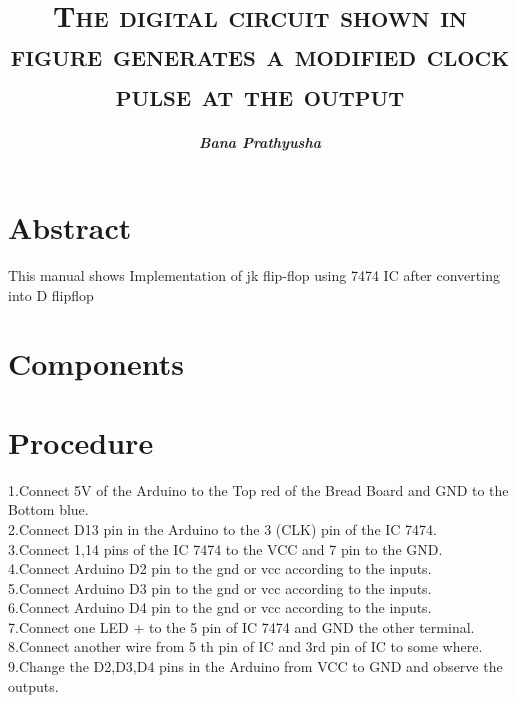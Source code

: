 \documentclass[jornal,10pt,twocolumn]{article}
\title{\textbf{\textsc{The digital circuit shown in figure generates a modified clock pulse at the output}}}
\author{\textit{\textbf{Bana Prathyusha}}}
\begin{document}
\maketitle
\section{Abstract}
This manual shows Implementation of jk flip-flop using 7474 IC after converting into D flipflop
\section{Components}
\begin{table}[ht]
\caption{}
\label{Tabel-1}
\end{table}
\section{Procedure}
1.Connect 5V  of the Arduino to the Top red of the Bread Board  and GND to the Bottom blue.
\\
2.Connect D13 pin in the Arduino to the 3 (CLK) pin of the IC 7474.
\\
3.Connect 1,14  pins of the IC 7474 to the VCC and 7 pin to the GND.
\\
4.Connect  Arduino D2 pin to the gnd or vcc according to the inputs.
\\
5.Connect Arduino D3 pin to the gnd or vcc according to the inputs.
\\
6.Connect Arduino D4 pin to the gnd or vcc according to the inputs.
\\
7.Connect one LED + to the 5 pin of IC 7474 and GND the other terminal.
\\
8.Connect another wire from 5 th pin of IC and 3rd pin of IC to some where.\\
9.Change the D2,D3,D4 pins in the Arduino  from VCC to GND and observe the outputs.
\\
\end{document}
